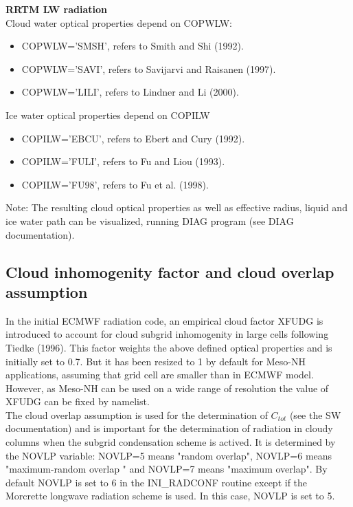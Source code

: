 {\bf RRTM LW radiation} \\

Cloud water optical properties depend on COPWLW:
\begin{itemize}
\item COPWLW='SMSH', refers to Smith and Shi (1992).

\item COPWLW='SAVI', refers to Savijarvi and Raisanen (1997).

\item COPWLW='LILI', refers to Lindner and Li (2000).

\end{itemize}


Ice water optical properties depend on COPILW

\begin{itemize}
\item COPILW='EBCU', refers to Ebert and Cury (1992).

\item COPILW='FULI', refers to Fu and Liou (1993).

\item COPILW='FU98', refers to Fu et al. (1998).
\end{itemize}

Note: The resulting cloud optical properties as well as effective radius, liquid and ice water path can be visualized, running DIAG program (see DIAG documentation).



\subsection{Cloud inhomogenity factor and cloud overlap assumption}

In the initial ECMWF radiation code, an empirical cloud factor XFUDG is introduced to account for cloud subgrid inhomogenity in large cells following Tiedke (1996). This factor weights the above defined optical properties and is initially set to 0.7. But it has been resized to 1 by default for Meso-NH applications, assuming that grid cell are smaller than in ECMWF model. However, as Meso-NH can be used on a wide range of resolution the value of XFUDG can be fixed by namelist.\\ 

The cloud overlap  assumption is used for the determination of $C_{tot}$ (see the SW documentation) and is important for the determination of radiation in cloudy columns when the subgrid condensation scheme is actived. It is determined by the NOVLP variable: NOVLP=5 means "random overlap", NOVLP=6 means "maximum-random overlap " and NOVLP=7 means "maximum overlap". By default NOVLP is set to 6 in the INI\_RADCONF routine except if the Morcrette longwave radiation scheme is used. In this case, NOVLP is set to 5. 


